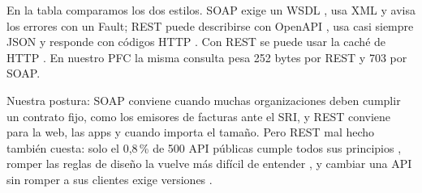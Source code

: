 En la tabla comparamos los dos estilos. SOAP exige un WSDL \cite{w3c_wsdl11}, usa XML y avisa los errores con un Fault; REST puede describirse con OpenAPI \cite{openapi31}, usa casi siempre JSON y responde con códigos HTTP \cite{rfc9110}. Con REST se puede usar la caché de HTTP \cite{rfc9111}. En nuestro PFC la misma consulta pesa 252 bytes por REST y 703 por SOAP.

Nuestra postura: SOAP conviene cuando muchas organizaciones deben cumplir un contrato fijo, como los emisores de facturas ante el SRI, y REST conviene para la web, las apps y cuando importa el tamaño. Pero REST mal hecho también cuesta: solo el 0,8\,\% de 500 API públicas cumple todos sus principios \cite{neumann2021}, romper las reglas de diseño la vuelve más difícil de entender \cite{bogner2023}, y cambiar una API sin romper a sus clientes exige versiones \cite{lercher2024}.
